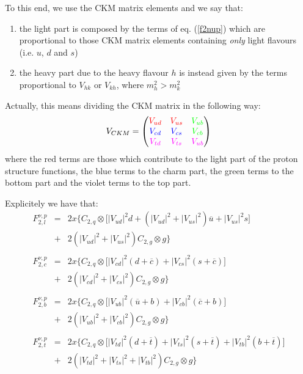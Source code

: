 \documentclass[10pt,a4paper]{article}
\begin{document}
To this end, we use the CKM matrix elements and we say that:
\begin{enumerate}
\item the light part is composed by the terms of eq. (\ref{f2nup})
  which are proportional to those CKM matrix elements containing
  \textit{only} light flavours (i.e. $u$, $d$ and $s$)
\item the heavy part due to the heavy flavour $h$ is instead given by
  the terms proportional to $V_{hk}$ or $V_{kh}$, where $m_h^2 >
  m_k^2$
\end{enumerate}
Actually, this means dividing the CKM matrix in the following way:
\begin{equation}
V_{CKM} =
\begin{pmatrix}
{\color{rosso}V_{ud}} & {\color{rosso}V_{us}} & {\color{verde}V_{ub}}\\
{\color{blu}V_{cd}} & {\color{blu}V_{cs}} & {\color{verde}V_{cb}}\\
{\color{viola}V_{td}} & {\color{viola}V_{ts}} & {\color{viola}V_{ub}}
\end{pmatrix}
\end{equation}
where the {\color{rosso} red terms} are those which contribute to the
{\color{rosso} light part} of the proton structure functions, the
{\color{blu} blue terms} to the {\color{blu} charm part}, the
{\color{verde} green terms} to the {\color{verde} bottom part} and the
{\color{viola} violet terms} to the {\color{viola} top part}.

Explicitely we have that:
\begin{equation}
\begin{array}{rcl}  
F_{2,l}^{\nu,p} &=& 2x\Big\{C_{2,q}\otimes\Big[|V_{ud}|^2 d +\left(|V_{ud}|^2+|V_{us}|^2\right)\overline{u} + |V_{us}|^2 s\Big]\\
                &+& 2\left(|V_{ud}|^2+|V_{us}|^2\right)C_{2,g}\otimes g\Big\}\\
\\
F_{2,c}^{\nu,p} &=& 2x\Big\{C_{2,q}\otimes\Big[|V_{cd}|^2(d+\overline{c}) + |V_{cs}|^2 (s+\overline{c})\Big]\\
                &+& 2\left(|V_{cd}|^2+|V_{cs}|^2\right)C_{2,g}\otimes g\Big\}\\
\\
F_{2,b}^{\nu,p} &=& 2x\Big\{C_{2,q}\otimes\Big[|V_{ub}|^2 (\overline{u}+b) + |V_{cb}|^2 (\overline{c}+b)\Big]\\
                &+& 2\left(|V_{ub}|^2+|V_{cb}|^2\right)C_{2,g}\otimes g\Big\}\\
\\
F_{2,t}^{\nu,p} &=& 2x\Big\{C_{2,q}\otimes\Big[|V_{td}|^2 (d +\overline{t})+ |V_{ts}|^2(s+\overline{t}) + |V_{tb}|^2(b+\overline{t})\Big]\\
                &+& 2\left(|V_{td}|^2 + |V_{ts}|^2 + |V_{tb}|^2\right)C_{2,g}\otimes g\Big\}
\end{array}
\end{equation}
\end{document}
